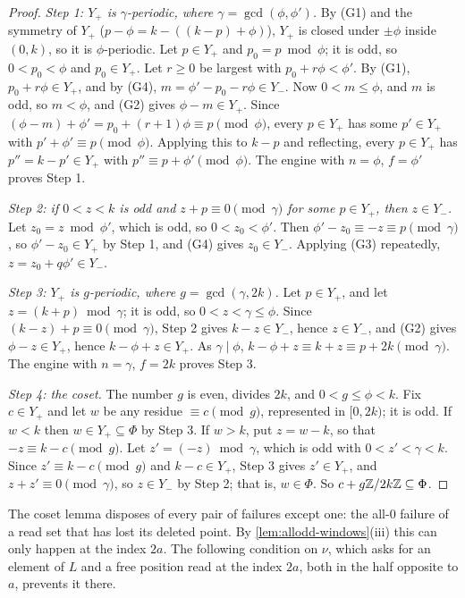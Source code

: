 \begin{proof}
\emph{Step 1: $Y_+$ is $\gamma$-periodic, where $\gamma=\gcd(\phi,\phi')$.} By
(G1) and the symmetry of $Y_+$ ($p-\phi=k-((k-p)+\phi)$), $Y_+$ is closed under
$\pm\phi$ inside $(0,k)$, so it is $\phi$-periodic. Let $p\in Y_+$ and
$p_0=p\bmod\phi$; it is odd, so $0<p_0<\phi$ and $p_0\in Y_+$. Let $r\ge0$ be
largest with $p_0+r\phi<\phi'$. By (G1), $p_0+r\phi\in Y_+$, and by (G4),
$m=\phi'-p_0-r\phi\in Y_-$. Now $0<m\le\phi$, and $m$ is odd, so $m<\phi$, and
(G2) gives $\phi-m\in Y_+$. Since $(\phi-m)+\phi'=p_0+(r+1)\phi\equiv p
\pmod\phi$, every $p\in Y_+$ has some $p'\in Y_+$ with $p'+\phi'\equiv p\pmod\phi$.
Applying this to $k-p$ and reflecting, every $p\in Y_+$ has $p''=k-p'\in Y_+$ with
$p''\equiv p+\phi'\pmod\phi$. The engine with $n=\phi$, $f=\phi'$ proves Step
1.

\emph{Step 2: if $0<z<k$ is odd and $z+p\equiv0\pmod\gamma$ for some $p\in Y_+$,
then $z\in Y_-$.} Let $z_0=z\bmod\phi'$, which is odd, so $0<z_0<\phi'$. Then
$\phi'-z_0\equiv-z\equiv p\pmod\gamma$, so $\phi'-z_0\in Y_+$ by Step 1, and
(G4) gives $z_0\in Y_-$. Applying (G3) repeatedly, $z=z_0+q\phi'\in Y_-$.

\emph{Step 3: $Y_+$ is $g$-periodic, where $g=\gcd(\gamma,2k)$.} Let $p\in Y_+$,
and let $z=(k+p)\bmod\gamma$; it is odd, so $0<z<\gamma\le\phi$. Since
$(k-z)+p\equiv0\pmod\gamma$, Step 2 gives $k-z\in Y_-$, hence $z\in Y_-$, and
(G2) gives $\phi-z\in Y_+$, hence $k-\phi+z\in Y_+$. As $\gamma\mid\phi$,
$k-\phi+z\equiv k+z\equiv p+2k\pmod\gamma$. The engine with $n=\gamma$,
$f=2k$ proves Step 3.

\emph{Step 4: the coset.} The number $g$ is even, divides $2k$, and
$0<g\le\phi<k$. Fix $c\in Y_+$ and let $w$ be any residue $\equiv c\pmod g$,
represented in $[0,2k)$; it is odd. If $w<k$ then $w\in Y_+\subseteq \Phi$ by Step
3. If $w>k$, put $z=w-k$, so that $-z\equiv k-c\pmod g$. Let $z'=(-z)\bmod
\gamma$, which is odd with $0<z'<\gamma<k$. Since $z'\equiv k-c\pmod g$ and
$k-c\in Y_+$, Step 3 gives $z'\in Y_+$, and $z+z'\equiv0\pmod\gamma$, so $z\in Y_-$
by Step 2; that is, $w\in \Phi$. So $c+g\mathbb{Z}/2k\mathbb{Z}\subseteq \Phi$.
\end{proof}

The coset lemma disposes of every pair of failures except one: the all-$0$
failure of a read set that has lost its deleted point. By
\autoref{lem:allodd-windows}(iii) this can only happen at the index $2a$.
The following condition on $\nu$, which asks for an element of $L$ and a free
position read at the index $2a$, both in the half opposite to $a$, prevents it
there.

